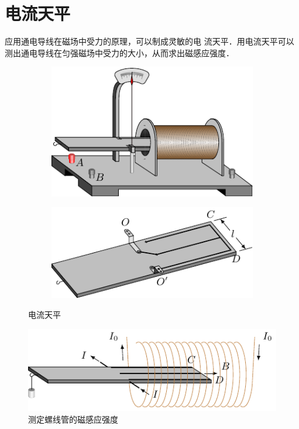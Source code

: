 \section{电流天平}
应用通电导线在磁场中受力的原理，可以制成灵敏的电
流天平．用电流天平可以测出通电导线在匀强磁场中受力的大小，从而求出磁感应强度．
\begin{figure}[htbp]
    \centering
    \begin{subfigure}{0.4\linewidth}
        \centering
        \includegraphics{fig/C/1-28a.pdf}
        \caption{}\label{fig_C_1-28a}
    \end{subfigure}
    \hfil
    \begin{subfigure}{0.4\linewidth}
        \centering
        \includegraphics{fig/C/1-28b.pdf}
        \caption{}\label{fig_C_1-28b}
    \end{subfigure}
    \caption{电流天平}\label{fig_C_1-28}
\end{figure}
\begin{figure}[htbp]
    \centering
    \includegraphics{fig/C/1-29.pdf}
    \caption{测定螺线管的磁感应强度}\label{fig_C_1-29}
\end{figure}

